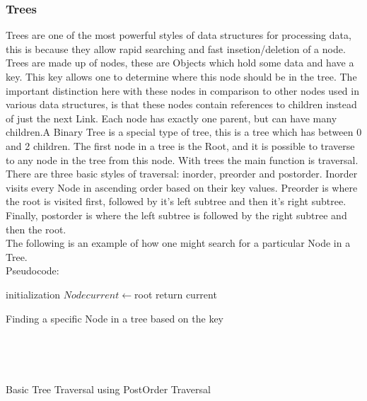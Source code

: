 \documentclass[10pt,twocolumn]{IEEEtran}
\begin{document}
\subsubsection{Trees}
Trees are one of the most powerful styles of data structures for processing data, this is because they allow rapid searching and fast insetion/deletion of a node. Trees are made up of nodes, these are Objects which hold some data and have a key. This key allows one to determine where this node should be in the tree. The important distinction here with these nodes in comparison to other nodes used in various data structures, is that these nodes contain references to children instead of just the next Link. Each node has exactly one parent, but can have many children.A Binary Tree is a special type of tree, this is a tree which has between 0 and 2 children. The first node in a tree is the Root, and it is possible to traverse to any node in the tree from this node.
With trees the main function is traversal. There are three basic styles of traversal: inorder, preorder and postorder. Inorder visits every Node in ascending order based on their key values. Preorder is where the root is visited first, followed by it's left subtree and then it's right subtree. Finally, postorder is where the left subtree is followed by the right subtree and then the root. \\
The following is an example of how one might search for a particular Node in a Tree.\\
Pseudocode:
\IncMargin{1em}
\begin{algorithm}
	\SetAlgoLined
	initialization\;
	$Node current \longleftarrow$root\;
return current\;
\caption{Finding a specific Node in a tree based on the key}
\end{algorithm}\DecMargin{1em}
\\
\IncMargin{1em}
\begin{algorithm}
	\SetAlgoLined
	\Indm{}
	\\
\caption{Basic Tree Traversal using PostOrder Traversal}
\end{algorithm}\DecMargin{1em}
\end{document}
